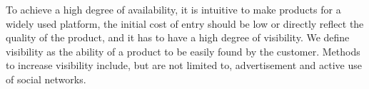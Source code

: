 To achieve a high degree of availability, it is intuitive to make products for a widely used platform, the initial cost of entry should be low or directly reflect the quality of the product, and it has to have a high degree of visibility. We define visibility as the ability of a product to be easily found by the customer. Methods to increase visibility include, but are not limited to, advertisement and active use of social networks.